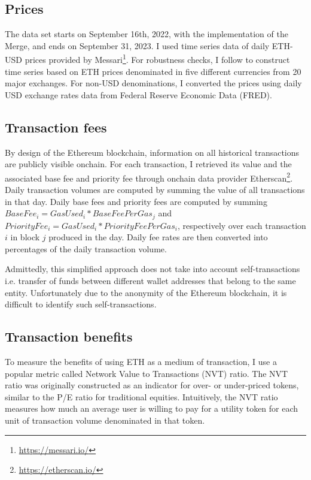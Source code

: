 \documentclass[12pt]{article}
\begin{document}
\subsection{Prices}
The data set starts on September 16th, 2022, with the implementation of the Merge, and ends on September 31, 2023. I used time series data of daily ETH-USD prices provided by Messari\footnote{\url{https://messari.io/}}. For robustness checks, I follow \cite{biais2023equilibrium} to construct time series based on ETH prices denominated in five different currencies from 20 major exchanges. For non-USD denominations, I converted the prices using daily USD exchange rates data from Federal Reserve Economic Data (FRED).


\subsection{Transaction fees}
By design of the Ethereum blockchain, information on all historical transactions are publicly visible onchain. For each transaction, I retrieved its value and the associated base fee and priority fee through onchain data provider Etherscan\footnote{\url{https://etherscan.io/}}. Daily transaction volumes are computed by summing the value of all transactions in that day. Daily base fees and priority fees are computed by summing $BaseFee_i=GasUsed_i*BaseFeePerGas_j$ and $PriorityFee_i=GasUsed_i*PriorityFeePerGas_i$, respectively over each transaction $i$ in block $j$ produced in the day. Daily fee rates are then converted into percentages of the daily transaction volume.

Admittedly, this simplified approach does not take into account self-transactions i.e. transfer of funds between different wallet addresses that belong to the same entity. Unfortunately due to the anonymity of the Ethereum blockchain, it is difficult to identify such self-transactions.

\subsection{Transaction benefits}
To measure the benefits of using ETH as a medium of transaction, I use a popular metric called Network Value to Transactions (NVT) ratio. The NVT ratio was originally constructed as an indicator for over- or under-priced tokens, similar to the P/E ratio for traditional equities. Intuitively, the NVT ratio measures how much an average user is willing to pay for a utility token for each unit of transaction volume denominated in that token. 
\end{document}
